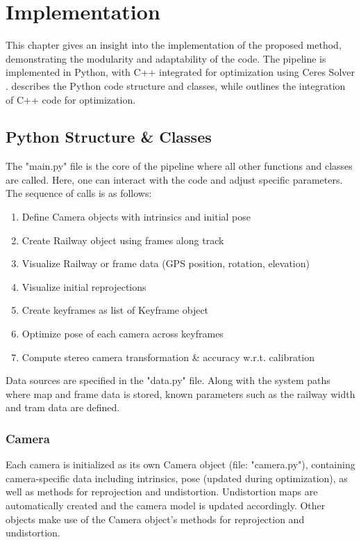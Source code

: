 \chapter{Implementation}
\label{chapter:implementation}

This chapter gives an insight into the implementation of the proposed method, demonstrating the modularity and adaptability of the code. The pipeline is implemented in Python, with C++ integrated for optimization using Ceres Solver \cite{agarwal2022ceres}.  describes the Python code structure and classes, while  outlines the integration of C++ code for optimization.

\section{Python Structure \& Classes}
\label{sec:python_classes}

The "main.py" file is the core of the pipeline where all other functions and classes are called. Here, one can interact with the code and adjust specific parameters. The sequence of calls is as follows:

\begin{enumerate}
    \item Define Camera objects with intrinsics and initial pose
    \item Create Railway object using frames along track
    \item Visualize Railway or frame data (GPS position, rotation, elevation)
    \item Visualize initial reprojections
    \item Create keyframes as list of Keyframe object
    \item Optimize pose of each camera across keyframes
    \item Compute stereo camera transformation \& accuracy w.r.t. calibration
\end{enumerate}

Data sources are specified in the "data.py" file. Along with the system paths where map and frame data is stored, known parameters such as the railway width and tram data \cite{strassmichael} are defined.


\subsection*{Camera}

Each camera is initialized as its own Camera object (file: "camera.py"), containing camera-specific data including intrinsics, pose (updated during optimization), as well as methods for reprojection and undistortion. Undistortion maps are automatically created and the camera model is updated accordingly. Other objects make use of the Camera object's methods for reprojection and undistortion.

